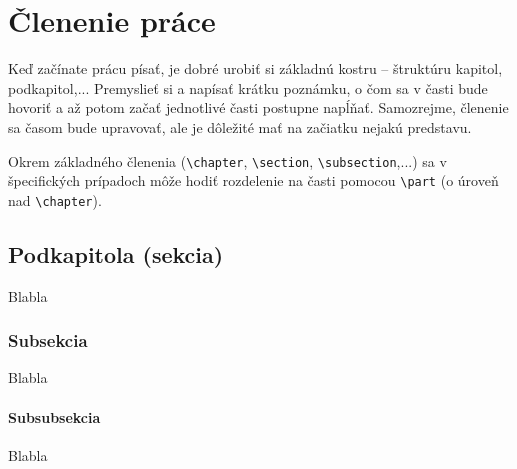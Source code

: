 \chapter{Členenie práce}

Keď začínate prácu písať, je dobré urobiť si základnú kostru -- štruktúru kapitol, podkapitol,... Premyslieť si a napísať krátku poznámku, o čom sa v časti bude hovoriť a až potom začať jednotlivé časti postupne napĺňať. Samozrejme, členenie sa časom bude upravovať, ale je dôležité mať na začiatku nejakú predstavu.

Okrem základného členenia (\texttt{\textbackslash chapter}, \texttt{\textbackslash section}, \texttt{\textbackslash subsection},...) sa v špecifických prípadoch môže hodiť rozdelenie na časti pomocou \texttt{\textbackslash part} (o úroveň nad \texttt{\textbackslash chapter}).


\section{Podkapitola (sekcia)}\label{}
Blabla

\subsection{Subsekcia}
Blabla

\subsubsection{Subsubsekcia}
Blabla

%
